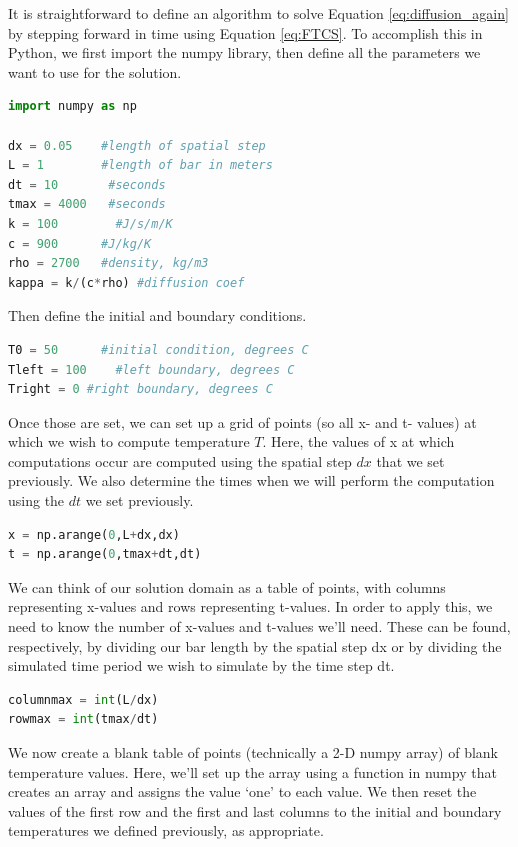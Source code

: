 It is straightforward to define an algorithm to solve Equation \ref{eq:diffusion_again} by stepping forward in time using Equation \ref{eq:FTCS}. To accomplish this in Python, we first import the numpy library, then define all the parameters we want to use for the solution.

\begin{lstlisting}[language=Python]
import numpy as np

dx = 0.05    #length of spatial step
L = 1        #length of bar in meters
dt = 10       #seconds
tmax = 4000   #seconds
k = 100        #J/s/m/K
c = 900      #J/kg/K
rho = 2700   #density, kg/m3
kappa = k/(c*rho) #diffusion coef
\end{lstlisting}

Then define the initial and boundary conditions.

\begin{lstlisting}[language=Python]
T0 = 50      #initial condition, degrees C
Tleft = 100    #left boundary, degrees C
Tright = 0 #right boundary, degrees C
\end{lstlisting}

Once those are set, we can set up a grid of points (so all x- and t- values) at which we wish to compute temperature $T$.  Here, the values of x at which computations occur are computed using the spatial step $dx$ that we set previously. We also determine the times when we will perform the computation using the $dt$ we set previously.

\begin{lstlisting}[language=Python]
x = np.arange(0,L+dx,dx)
t = np.arange(0,tmax+dt,dt)
\end{lstlisting}

We can think of our solution domain as a table of points, with columns representing x-values and rows representing t-values. In order to apply this, we need to know the number of x-values and t-values we'll need.  These can be found, respectively, by dividing our bar length by the spatial step dx or by dividing the simulated time period we wish to simulate by the time step dt.

\begin{lstlisting}[language=Python]
columnmax = int(L/dx)
rowmax = int(tmax/dt)
\end{lstlisting}

We now create a blank table of points (technically a 2-D numpy array) of blank temperature values. Here, we'll set up the array using a function in numpy that creates an array and assigns the value `one' to each value. We then reset the values of the first row and the first and last columns to the initial and boundary temperatures we defined previously, as appropriate.

